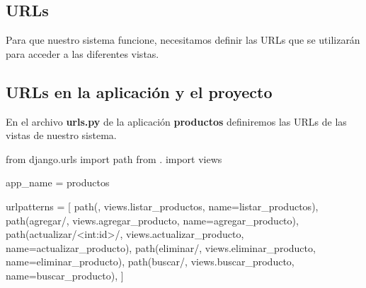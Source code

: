 \documentclass[
  a4paper,
  DIV=11,
  numbers=noendperiod,
  onepage,
  openany]{scrreprt}
\newenvironment{Shaded}{\begin{snugshade}}{\end{snugshade}}
\newcommand{\ImportTok}[1]{\textcolor[rgb]{0.00,0.46,0.62}{#1}}
\newcommand{\NormalTok}[1]{\textcolor[rgb]{0.00,0.23,0.31}{#1}}
\newcommand{\OperatorTok}[1]{\textcolor[rgb]{0.37,0.37,0.37}{#1}}
\newcommand{\StringTok}[1]{\textcolor[rgb]{0.13,0.47,0.30}{#1}}
\begin{document}
\begin{tcolorbox}
\chapter{URLs}\label{urls}

Para que nuestro sistema funcione, necesitamos definir las URLs que se
utilizarán para acceder a las diferentes vistas.

\section{URLs en la aplicación y el
proyecto}\label{urls-en-la-aplicaciuxf3n-y-el-proyecto}

En el archivo \textbf{urls.py} de la aplicación \textbf{productos}
definiremos las URLs de las vistas de nuestro sistema.

\begin{Shaded}
\begin{Highlighting}[]
\ImportTok{from}\NormalTok{ django.urls }\ImportTok{import}\NormalTok{ path}
\ImportTok{from}\NormalTok{ . }\ImportTok{import}\NormalTok{ views}

\NormalTok{app\_name }\OperatorTok{=} \StringTok{\textquotesingle{}productos\textquotesingle{}}

\NormalTok{urlpatterns }\OperatorTok{=}\NormalTok{ [}
\NormalTok{    path(}\StringTok{\textquotesingle{}\textquotesingle{}}\NormalTok{, views.listar\_productos, name}\OperatorTok{=}\StringTok{\textquotesingle{}listar\_productos\textquotesingle{}}\NormalTok{),}
\NormalTok{    path(}\StringTok{\textquotesingle{}agregar/\textquotesingle{}}\NormalTok{, views.agregar\_producto, name}\OperatorTok{=}\StringTok{\textquotesingle{}agregar\_producto\textquotesingle{}}\NormalTok{),}
\NormalTok{    path(}\StringTok{\textquotesingle{}actualizar/\textless{}int:id\textgreater{}/\textquotesingle{}}\NormalTok{, views.actualizar\_producto, name}\OperatorTok{=}\StringTok{\textquotesingle{}actualizar\_producto\textquotesingle{}}\NormalTok{),}
\NormalTok{    path(}\StringTok{\textquotesingle{}eliminar/\textquotesingle{}}\NormalTok{, views.eliminar\_producto, name}\OperatorTok{=}\StringTok{\textquotesingle{}eliminar\_producto\textquotesingle{}}\NormalTok{),}
\NormalTok{    path(}\StringTok{\textquotesingle{}buscar/\textquotesingle{}}\NormalTok{, views.buscar\_producto, name}\OperatorTok{=}\StringTok{\textquotesingle{}buscar\_producto\textquotesingle{}}\NormalTok{),}
\NormalTok{]}
\end{Highlighting}
\end{Shaded}


\end{tcolorbox}
\end{document}
